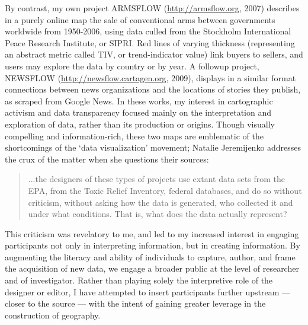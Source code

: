 \documentclass[11pt,oneside,notitlepage]{report}
\begin{document}
By contrast, my own project ARMSFLOW (\url{http://armsflow.org}, 2007) describes in a purely online map the sale of conventional arms between governments worldwide from 1950-2006, using data culled from the Stockholm International Peace Research Institute, or SIPRI. Red lines of varying thickness (representing an abstract metric called TIV, or trend-indicator value) link buyers to sellers, and users may explore the data by country or by year. A followup project, NEWSFLOW (\url{http://newsflow.cartagen.org}, 2009), displays in a similar format connections between news organizations and the locations of stories they publish, as scraped from Google News. In these works, my interest in cartographic activism and data transparency focused mainly on the interpretation and exploration of data, rather than its production or origins. Though visually compelling and information-rich, these two maps are emblematic of the shortcomings of the `data visualization' movement; Natalie Jeremijenko addresses the crux of the matter when she questions their sources: 

\begin{quote}
...the designers of these types of projects use extant data sets from the EPA, from the Toxic Relief Inventory, federal databases, and do so without criticism, without asking how the data is generated, who collected it and under what conditions. That is, what does the data actually represent? \cite{jeremijenko2008situated}
\end{quote}

This criticism was revelatory to me, and led to my increased interest in engaging participants not only in interpreting information, but in creating information. By augmenting the literacy and ability of individuals to capture, author, and frame the acquisition of new data, we engage a broader public at the level of researcher and of investigator. Rather than playing solely the interpretive role of the designer or editor, I have attempted to insert participants further upstream --- closer to the source --- with the intent of gaining greater leverage in the construction of geography. 

\end{document}
